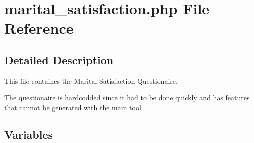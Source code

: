 \section{marital\_\-satisfaction.php File Reference}
\label{d1/d7c/a00003}


\subsection{Detailed Description}
This file containes the Marital Satisfaction Questionaire. 

The questionaire is hardcodded since it had to be done quickly and has features that cannot be generated with the main tool 

\subsection*{Variables}
